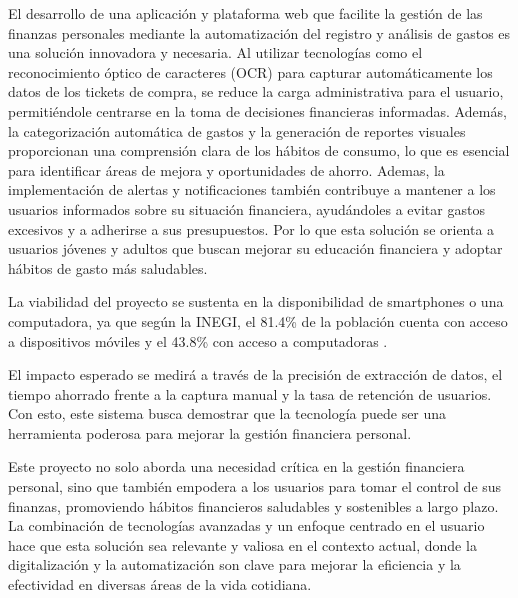 El desarrollo de una aplicación y plataforma web que facilite la gestión de las finanzas personales mediante la automatización del registro y análisis de gastos es una solución 
innovadora y necesaria. 
Al utilizar tecnologías como el reconocimiento óptico de caracteres (OCR) para capturar automáticamente los datos de los tickets de compra, se reduce la carga administrativa 
para el usuario, permitiéndole centrarse en la toma de decisiones financieras informadas. Además, la categorización automática de gastos y la generación de reportes visuales 
proporcionan una comprensión clara de los hábitos de consumo, lo que es esencial para identificar áreas de mejora y oportunidades de ahorro. Ademas, la implementación de alertas
y notificaciones también contribuye a mantener a los usuarios informados sobre su situación financiera, ayudándoles a evitar gastos excesivos y a adherirse a sus 
presupuestos. Por lo que esta solución se orienta a usuarios jóvenes y adultos que buscan mejorar su educación financiera y adoptar hábitos de gasto más saludables.

La viabilidad del proyecto se sustenta en la disponibilidad de smartphones o una computadora, ya que según la INEGI, el 81.4\% de la población cuenta con acceso a dispositivos móviles y
el 43.8\% con acceso a computadoras \cite{EncINEGI}.

El impacto esperado se medirá a través de la precisión de extracción de datos, el tiempo ahorrado frente a la captura manual y la tasa de retención de usuarios.
Con esto, este sistema busca demostrar que la tecnología puede ser una herramienta poderosa para mejorar la gestión financiera personal.

Este proyecto no solo aborda una necesidad crítica en la gestión financiera personal, sino que también empodera a los usuarios para tomar el control de sus finanzas, 
promoviendo hábitos financieros saludables y sostenibles a largo plazo. La combinación de tecnologías avanzadas y un enfoque centrado en el usuario hace que esta solución 
sea relevante y valiosa en el contexto actual, donde la digitalización y la automatización son clave para mejorar la eficiencia y la efectividad en diversas áreas de 
la vida cotidiana.
